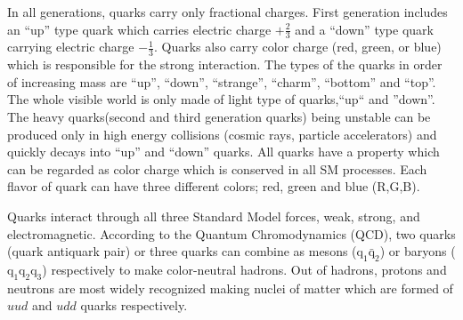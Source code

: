 In all generations, quarks carry only fractional charges. First generation includes an ``up'' type quark which carries electric charge $+\frac{2}{3}$ and a ``down'' type quark carrying electric charge
$-\frac{1}{3}$. Quarks also carry color charge (red, green, or blue) which is responsible for the strong interaction. The types of the quarks in order of increasing mass are ``up'', ``down'', ``strange'', ``charm'', ``bottom'' and ``top''. The whole visible world is only made of light type of quarks,``up`` and ''down''. The heavy quarks(second and third generation quarks) being unstable can be produced only in high energy collisions (cosmic rays, particle accelerators) and quickly decays into ``up'' and ``down'' quarks. All quarks have a property which can be regarded as  color charge which is conserved in all SM processes. Each flavor of quark can have three different colors; red, green and blue (R,G,B).
\par Quarks interact through all three Standard Model forces, weak, strong, and electromagnetic. 
According to the Quantum Chromodynamics (QCD), two quarks (quark antiquark pair) or three quarks can combine as mesons (\ensuremath{\mathrm{q_1\bar{q}_{2}}}) or baryons (\ensuremath{\mathrm{q_1 q_2 q_3}}) respectively to make color-neutral hadrons. Out of hadrons, protons and neutrons are most widely 
recognized making nuclei of matter which are formed of $uud$ and $udd$ quarks respectively.

